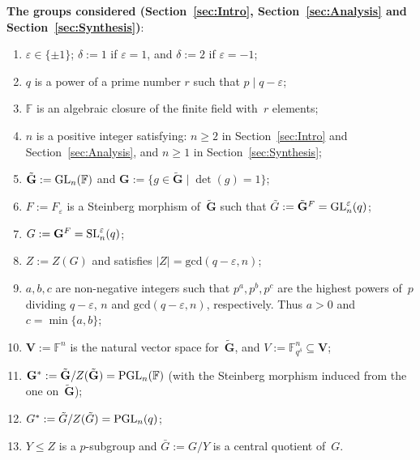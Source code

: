 \documentclass[12pt]{amsart}
\newcommand{\bG}{{\mathbf{G}}}      %
\newcommand{\bV}{{\mathbf{V}}}
\def\GL{ \text{\rm GL} }
\def\SL{ \text{\rm SL} }
\def\PGL{ \text{\rm PGL} }
\theoremstyle{theorem}
\theoremstyle{definition}
\theoremstyle{remark}
\begin{document}
\noindent\textbf{The groups considered (Section~\ref{sec:Intro}, 
                 Section~\ref{sec:Analysis} and Section~\ref{sec:Synthesis})}:
\begin{enumerate}[label=$\bullet$, leftmargin=5mm]
        \item  $\varepsilon\in\{\pm 1\}$; $\delta := 1$ if $\varepsilon = 1$, and  
               $\delta := 2$ if $\varepsilon = -1$;
	\item  $q$ is a power of a prime number $r$ such that $p \mid q-\varepsilon$;
	\item  $\mathbb{F}$ is an algebraic closure of the finite field with~$r$ elements;
	\item  $n$ is a positive integer satisfying: $n\geq 2$ in Section~\ref{sec:Intro} 
               and Section~\ref{sec:Analysis}, and $n\geq 1$ in Section~\ref{sec:Synthesis};
	\item  $\tilde{\bG} := \GL_n( \mathbb{F} )$ and 
               $\bG :=\{ g \in \tilde{\bG} \mid \det(g) = 1 \}$; 
	\item  $F := F_{\varepsilon}$ is a Steinberg morphism of~$\tilde{\bG}$ such that 
               {$\tilde{G} := \tilde{\bG}^F = \GL_n^\varepsilon( q )$};
	\item  $G := \bG^F = \SL_n^\varepsilon( q )$;
	\item  $Z := Z( G )$ and satisfies $|Z|=\mathrm{gcd}(q-\varepsilon,n)$;
        \item  $a, b, c$ are non-negative integers such that $p^a, p^b, p^c$
               are the highest powers of~$p$ dividing $q - \varepsilon$, $n$ and
               $\mathrm{gcd}(q-\varepsilon,n)$, respectively. Thus $a > 0$ and
               $c = \min \{ a, b \}$;
	\item  $\bV := \mathbb{F}^n$ is the natural vector space for~$\tilde{\bG}$, 
               and $V := \mathbb{F}_{q^\delta}^n \subseteq \bV$;
	\item  $\bG^* := \tilde{\bG}/Z( \tilde{\bG} ) = \PGL_n( \mathbb{F} )$ 
               (with the Steinberg morphism induced from the one on~$\tilde{\bG}$);
	\item  $G^* := \tilde{G}/Z( \tilde{G} ) = \PGL_n( q )$;
	\item  $Y\leq Z$ is a $p$-subgroup and  $\bar{G}:=G/Y$ is a central quotient 
               of~$G$.
\end{enumerate}
\smallskip
\end{document}
